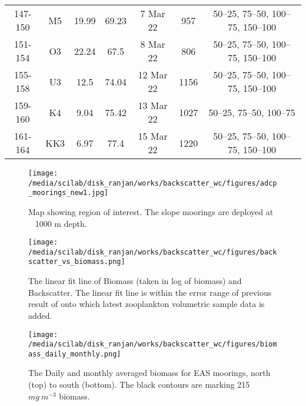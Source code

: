 \documentclass{article}
\begin{document}
\begin{table}[htbp]
{\begin{adjustwidth}{0in}{0in}
\begin{tabular}{ccccccc}
				147-150       & M5  & 19.99      & 69.23      & 7 Mar 22                  & 957        & 50–25, 75–50, 100–75, 150–100 \\
				151-154       & O3  & 22.24      & 67.5       & 8 Mar 22                  & 806        & 50–25, 75–50, 100–75, 150–100 \\
				155-158       & U3  & 12.5       & 74.04      & 12 Mar 22                 & 1156       & 50–25, 75–50, 100–75, 150–100 \\
				159-160       & K4  & 9.04       & 75.42      & 13 Mar 22                 & 1027       & 50–25, 75–50, 100–75          \\
				161-164       & KK3 & 6.97       & 77.4       & 15 Mar 22                 & 1220       & 50–25, 75–50, 100–75, 150–100
				\\ 
				\bottomrule
			\end{tabular}
		\end{adjustwidth}
	}
\end{table}


\newpage
\begin{figure}[htbp]
	\centering
	\texttt{[image: /media/scilab/disk\_ranjan/works/backscatter\_wc/figures/adcp\_moorings\_new1.jpg]} 
	\captionsetup{justification=justified,font=footnotesize,skip=0.05\baselineskip,width=0.4\textwidth}
	\caption{Map showing region of interest. The slope moorings are deployed at ~ 1000 m depth.}
	\label{fig:fig1}
\end{figure}

\newpage
\begin{figure}[htbp]
	\centering
	\texttt{[image: /media/scilab/disk\_ranjan/works/backscatter\_wc/figures/backscatter\_vs\_biomass.png]} 
	\captionsetup{justification=justified,font=footnotesize,skip=0.05\baselineskip,width=0.7\textwidth}
	\caption{The linear fit line of Biomass (taken in log of biomass) and Backscatter. The linear fit line is within the error range of previous result of \citep{aparna2022seasonal} onto which latest zooplankton volumetric sample data is added.}
	\label{fig:fig2}
\end{figure}


\newpage


\begin{figure}[htbp]
	\centering
	\texttt{[image: /media/scilab/disk\_ranjan/works/backscatter\_wc/figures/biomass\_daily\_monthly.png]} 
	\captionsetup{justification=justified,font=footnotesize,skip=0.05\baselineskip,width=\textwidth}
	\caption{The Daily and monthly averaged biomass for EAS moorings, north (top) to south (bottom). The black contours are marking 215 $mg\ m^{-3}$ biomass.}
	\label{fig:fig3}
\end{figure}
\end{document}
